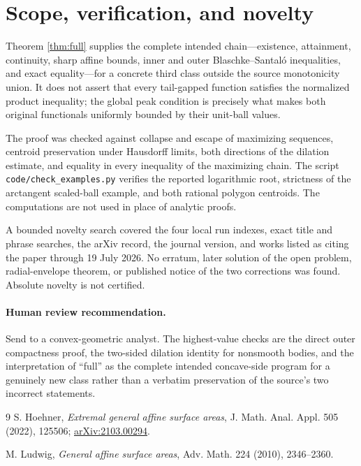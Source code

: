 \documentclass[11pt]{article}
\begin{document}
\section{Scope, verification, and novelty}

Theorem \ref{thm:full} supplies the complete intended chain---existence,
attainment, continuity, sharp affine bounds, inner and outer
Blaschke--Santal\'o inequalities, and exact equality---for a concrete third
class outside the source monotonicity union.  It does not assert that every
tail-gapped function satisfies the normalized product inequality; the global
peak condition is precisely what makes both original functionals uniformly
bounded by their unit-ball values.

The proof was checked against collapse and escape of maximizing sequences,
centroid preservation under Hausdorff limits, both directions of the dilation
estimate, and equality in every inequality of the maximizing chain.  The
script \texttt{code/check\_examples.py} verifies the reported logarithmic
root, strictness of the arctangent scaled-ball example, and both rational
polygon centroids.  The computations are not used in place of analytic
proofs.

A bounded novelty search covered the four local run indexes, exact title and
phrase searches, the arXiv record, the journal version, and works listed as
citing the paper through 19 July 2026.  No erratum, later solution of the open
problem, radial-envelope theorem, or published notice of the two corrections
was found.  Absolute novelty is not certified.

\paragraph{Human review recommendation.}
Send to a convex-geometric analyst.  The highest-value checks are the direct
outer compactness proof, the two-sided dilation identity for nonsmooth bodies,
and the interpretation of ``full'' as the complete intended concave-side
program for a genuinely new class rather than a verbatim preservation of the
source's two incorrect statements.

\begin{thebibliography}{9}
S. Hoehner,
\emph{Extremal general affine surface areas},
J. Math. Anal. Appl. 505 (2022), 125506;
\href{https://arxiv.org/abs/2103.00294}{arXiv:2103.00294}.

\par\medskip

M. Ludwig,
\emph{General affine surface areas},
Adv. Math. 224 (2010), 2346--2360.
\end{thebibliography}
\end{document}
